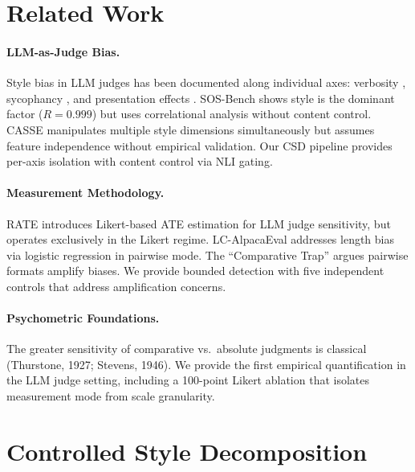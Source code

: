 \documentclass[11pt,twocolumn]{article}
\begin{document}
\section{Related Work}
\label{sec:related}

\paragraph{LLM-as-Judge Bias.}
Style bias in LLM judges has been documented along individual axes: verbosity \cite{saito2023verbosity,wu2024sosbench}, sycophancy \cite{sharma2024towards}, and presentation effects \cite{park2024offsetbias}. SOS-Bench \cite{wu2024sosbench} shows style is the dominant factor ($R = 0.999$) but uses correlational analysis without content control. CASSE \cite{chen2024casse} manipulates multiple style dimensions simultaneously but assumes feature independence without empirical validation. Our CSD pipeline provides per-axis isolation with content control via NLI gating.

\paragraph{Measurement Methodology.}
RATE \cite{stureborg2024rate} introduces Likert-based ATE estimation for LLM judge sensitivity, but operates exclusively in the Likert regime. LC-AlpacaEval \cite{dubois2024lengthcontrolled} addresses length bias via logistic regression in pairwise mode. The ``Comparative Trap'' \cite{jeong2025comparative} argues pairwise formats amplify biases. We provide bounded detection with five independent controls that address amplification concerns.

\paragraph{Psychometric Foundations.}
The greater sensitivity of comparative vs.\ absolute judgments is classical (Thurstone, 1927; Stevens, 1946). We provide the first empirical quantification in the LLM judge setting, including a 100-point Likert ablation that isolates measurement mode from scale granularity.

\section{Controlled Style Decomposition}
\label{sec:method}
\end{document}
